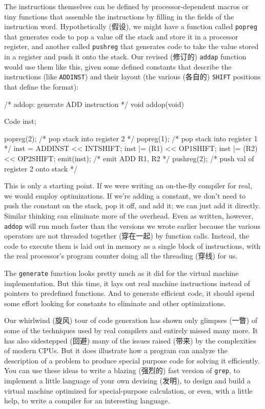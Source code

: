 The instructions themselves can be defined by processor-dependent macros or
tiny functions that assemble the instructions by filling in the fields of
the instruction word.  Hypothetically (假设), we might have a function
called \verb'popreg' that generates code to pop a value off the stack and
store it in a processor register, and another called \verb'pushreg' that
generates code to take the value stored in a register and push it onto the
stack. Our revised (修订的) \verb'addap' function would use them like this,
given some defined constants that describe the instructions (like
\verb'ADDINST') and their layout (the various (各自的) \verb'SHIFT'
positions that define the format):
\begin{wellcode}
    /* addop: generate ADD instruction */
    void addop(void)
    {
        Code    inst;

        popreg(2);      /* pop stack into register 2 */
        popreg(1);      /* pop stack into register 1 */
        inst = ADDINST << INTSHIFT;
        inst |= (R1) << OP1SHIFT;
        inst |= (R2) << OP2SHIFT;
        emit(inst);     /* emit ADD R1, R2 */
        pushreg(2);     /* push val of register 2 onto stack */
    }
\end{wellcode}
This is only a starting point. If we were writing an on-the-fly compiler
for real, we would employ optimizations. If we're adding a constant, we
don't need to push the constant on the stack, pop it off, and add it; we
can just add it directly.  Similar thinking can eliminate more of the
overhead. Even as written, however, \verb'addop' will run much faster than
the versions we wrote earlier because the various operators are not
threaded together (穿在一起) by function calls. Instead, the code to
execute them is laid out in memory as a single block of instructions, with
the real processor's program counter doing all the threading (穿线) for us.

The \verb'generate' function looks pretty much as it did for the virtual
machine implementation. But this time, it lays out real machine
instructions instead of pointers to predefined functions. And to generate
efficient code, it should spend some effort looking for constants to
eliminate and other optimizations.

Our whirlwind (旋风) tour of code generation has shown only glimpses (一瞥)
of some of the techniques used by real compilers and entirely missed many
more. It has also sidestepped (回避) many of the issues raised (带来) by
the complexities of modern CPUs.  But it does illustrate how a program can
analyze the description of a problem to produce special purpose code for
solving it efficiently. You can use these ideas to write a blazing (强烈的)
fast version of \verb'grep', to implement a little language of your own
devising (发明), to design and build a virtual machine optimized for
special-purpose calculation, or even, with a little help, to write a
compiler for an interesting language.

